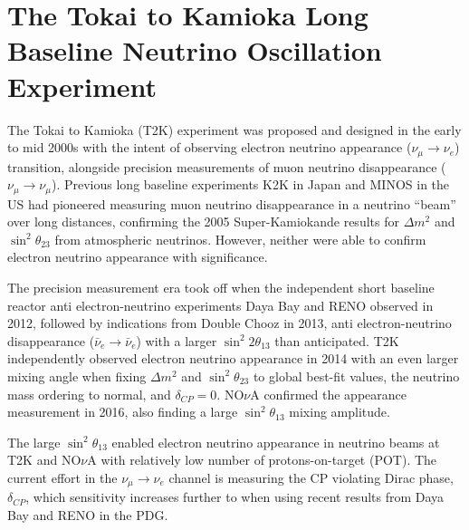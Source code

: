 \chapter{The Tokai to Kamioka Long Baseline Neutrino Oscillation Experiment}
\label{chap:detectors}

The Tokai to Kamioka (T2K) experiment was proposed and designed in the early to mid 2000s with the intent of observing electron neutrino appearance ($\nu_\mu \rightarrow \nu_e$) transition, alongside precision measurements of muon neutrino disappearance ($\nu_\mu \rightarrow \nu_\mu$)\cite{t2k_loi,t2k_prop}. Previous long baseline experiments K2K\cite{k2k_obs} in Japan and MINOS\cite{minos_obs} in the US had pioneered measuring muon neutrino disappearance in a neutrino ``beam'' over long distances, confirming the 2005 Super-Kamiokande results for $\Delta m^2$ and $\sin^2 \theta_{23}$ from atmospheric neutrinos\cite{sk_2005}. However, neither were able to confirm electron neutrino appearance with significance.

The precision measurement era took off when the independent short baseline reactor anti electron-neutrino experiments Daya Bay\cite{daya_bay_disc} and RENO\cite{reno_disc} observed in 2012, followed by indications from Double Chooz\cite{chooz_disc} in 2013, anti electron-neutrino disappearance ($\bar{\nu}_e \rightarrow \bar{\nu}_e$) with a larger $\sin^2 2\theta_{13}$ than anticipated. T2K independently observed electron neutrino appearance\cite{t2k_disc} in 2014 with an even larger mixing angle when fixing $\Delta m^2$ and $\sin^2 \theta_{23}$ to global best-fit values, the neutrino mass ordering to normal, and $\delta_{CP}=0$. NO$\nu$A confirmed\cite{nova_disc} the appearance measurement in 2016, also finding a large $\sin^2 \theta_{13}$ mixing amplitude.

The large $\sin^2 \theta_{13}$ enabled electron neutrino appearance in neutrino beams at T2K and NO$\nu$A with relatively low number of protons-on-target (POT). The current effort in the $\nu_\mu \rightarrow \nu_e$ channel is measuring the CP violating Dirac phase, $\delta_{CP}$, which sensitivity increases further to when using recent results from Daya Bay\cite{daya_bay} and RENO\cite{reno} in the PDG\cite{pdg_2017}.

